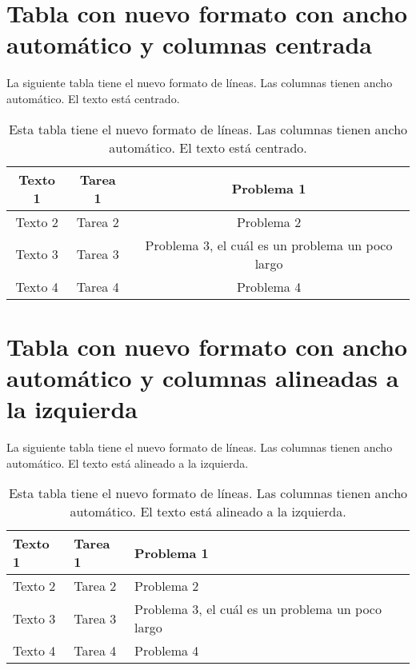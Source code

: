 \section*{Tabla con nuevo formato con ancho automático y columnas centrada}

La siguiente tabla tiene el nuevo formato de líneas. Las columnas tienen ancho automático. El texto está centrado.

\begin{table}[h]
	\centering
	\begin{tabular}{c c c}
		\toprule[2pt]
		\textbf{Texto 1} & \textbf{Tarea 1} & \textbf{Problema 1} \\
		\midrule[1.5pt]
		Texto 2 & Tarea 2 & Problema 2 \\
		\hline
		Texto 3 & Tarea 3 & Problema 3, el cuál es un problema un poco largo \\
		\hline
		Texto 4 & Tarea 4 & Problema 4 \\
		\bottomrule[2pt]
	\end{tabular}
	\caption[Tabla con nuevo formato con ancho automático y columnas centradas]{Esta tabla tiene el nuevo formato de líneas. Las columnas tienen ancho automático. El texto está centrado.}
	\label{table7}
\end{table}

\section*{Tabla con nuevo formato con ancho automático y columnas alineadas a la izquierda}

La siguiente tabla tiene el nuevo formato de líneas. Las columnas tienen ancho automático. El texto está alineado a la izquierda.

\begin{table}[h]
	\centering
	\begin{tabular}{l l l}
		\toprule[2pt]
		\textbf{Texto 1} & \textbf{Tarea 1} & \textbf{Problema 1} \\
		\midrule[1.5pt]
		Texto 2 & Tarea 2 & Problema 2 \\
		\hline
		Texto 3 & Tarea 3 & Problema 3, el cuál es un problema un poco largo \\
		\hline
		Texto 4 & Tarea 4 & Problema 4 \\
		\bottomrule[2pt]
	\end{tabular}
	\caption[Tabla con nuevo formato con ancho automático y columnas alineadas a la izquierda]{Esta tabla tiene el nuevo formato de líneas. Las columnas tienen ancho automático. El texto está alineado a la izquierda.}
	\label{table8}
\end{table}

